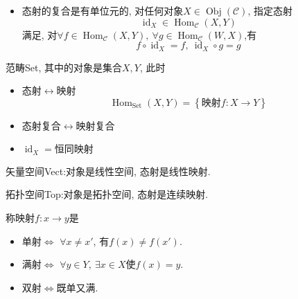 \begin{definition}
\begin{itemize}
        \item 态射的复合是有单位元的, 对任何对象$X \in \operatorname{Obj} (\mathcal{C})$, 指定态射
        \begin{equation}
          \operatorname{id}_{X} \in \operatorname{Hom}_{\mathcal{C}}(X,Y)
        \end{equation}
        满足, 对$\forall f \in \operatorname{Hom}_{\mathcal{C}} (X,Y) , \ \forall g \in \operatorname{Hom}_{\mathcal{C}}(W,X)$,有
        \begin{equation}
          f \circ \operatorname{id}_{X} = f , \ 
          \operatorname{id}_{X} \circ g = g
        \end{equation}
    \end{itemize}
\end{definition}

\begin{example}
    范畴Set, 其中的对象是集合$X,Y$, 此时
    \begin{itemize}
        \item 态射$\longleftrightarrow$映射
        \begin{equation}
          \operatorname{Hom}_{\text{Set}} (X,Y) = \left\{ \text{映射}f\colon X \rightarrow Y \right\} 
        \end{equation}

        \item 态射复合$\longleftrightarrow$映射复合
        
        \item $\operatorname{id}_{X} = \text{恒同映射}$
    \end{itemize}
\end{example}

\begin{example}
    矢量空间Vect:对象是线性空间, 态射是线性映射.

\end{example}

\begin{example}
    拓扑空间Top:对象是拓扑空间, 态射是连续映射.
\end{example}

\begin{definition}[集合论中]
    称映射$f \colon x \to y$是
    \begin{itemize}
        \item 单射$\iff$ $\forall x \neq x'$, 有$f(x)\neq f(x')$.
        \item 满射$\iff$ $\forall y\in Y, \ \exists x\in X \text{使}f(x) = y$.
        \item 双射$\iff$既单又满.
    \end{itemize}
\end{definition}

